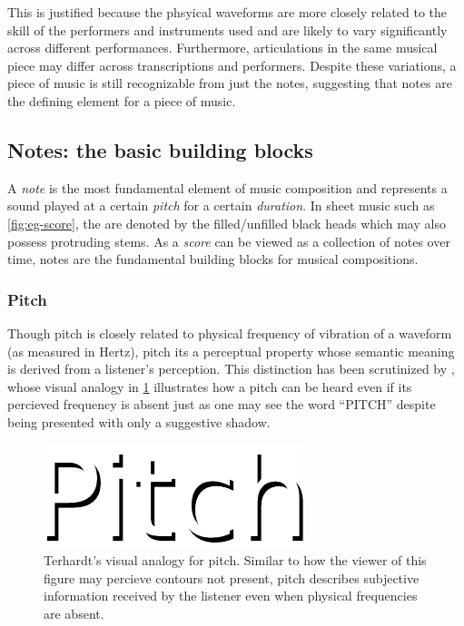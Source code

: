 This is justified because the phsyical waveforms are more closely related
to the skill of the performers and instruments used and are likely to vary
significantly across different performances. Furthermore, articulations in
the same musical piece may differ across transcriptions and performers.
Despite these variations, a piece of music is still recognizable from just the
notes, suggesting that notes are the defining element for a piece of music.

\subsection{Notes: the basic building blocks}

A \emph{note} is the most fundamental element of music composition and
represents a sound played at a certain \emph{pitch} for a certain
\emph{duration}. In sheet music such as \cref{fig:eg-score}, the are denoted
by the filled/unfilled black heads which may also possess protruding stems.
As a \emph{score} can be viewed as a collection of notes over time, notes are
the fundamental building blocks for musical compositions.

\subsubsection{Pitch}

Though pitch is closely related to physical frequency of vibration of a
waveform (as measured in Hertz), pitch its a perceptual property whose semantic
meaning is derived from a listener's perception. This distinction has been
scrutinized by
\citet{:/content/asa/journal/jasa/55/5/10.1121/1.1914648}, whose visual analogy
in \cref{fig:pitch} illustrates how a pitch can be heard even if its
percieved frequency is absent just as one may see the word ``PITCH'' despite
being presented with only a suggestive shadow.

\begin{figure}[htpb]
    \centering
    \includegraphics[width=0.6\linewidth]{pitch.pdf}
    \caption{Terhardt's visual analogy for pitch. Similar to how the viewer of this figure may percieve contours not present, pitch describes subjective information received by the listener even when physical frequencies are absent.}
    \label{fig:pitch}
\end{figure}

